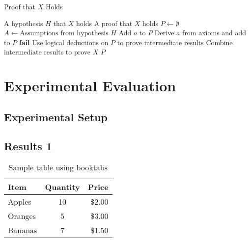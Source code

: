 \documentclass[a4paper,oneside,bibliography=totoc]{scrbook}
\begin{document}
\begin{algorithm}[t]
  \caption{Proof that $X$ Holds}
  \label{alg:proofX}
  \begin{algorithmic}[1]
    \REQUIRE A hypothesis $H$ that $X$ holds \ENSURE A proof that $X$ holds
    \STATE $P \leftarrow \emptyset$  \STATE $A \leftarrow \text{Assumptions from hypothesis } H$
       \STATE Add $a$ to $P$ 
    \STATE Derive $a$ from axioms and add to $P$ \ELSE \STATE \textbf{fail}
     \ENDIF \ENDFOR
    \STATE Use logical deductions on $P$ to prove intermediate results \STATE
    Combine intermediate results to prove $X$ \RETURN $P$ 
  \end{algorithmic}
\end{algorithm}

\lipsum[4-10]

\chapter{Experimental Evaluation}

\section{Experimental Setup}

\section{Results 1}

\begin{table}[tb]
  \centering
  \begin{tabular}{lcr}
    \toprule
    \textbf{Item} & \textbf{Quantity} & \textbf{Price} \\
    \midrule
    Apples  & 10 & \$2.00 \\
    Oranges & 5  & \$3.00 \\
    Bananas & 7  & \$1.50 \\
    \bottomrule
  \end{tabular}
  \caption{Sample table using booktabs}
  \label{tab:sample}
\end{table}
\end{document}
